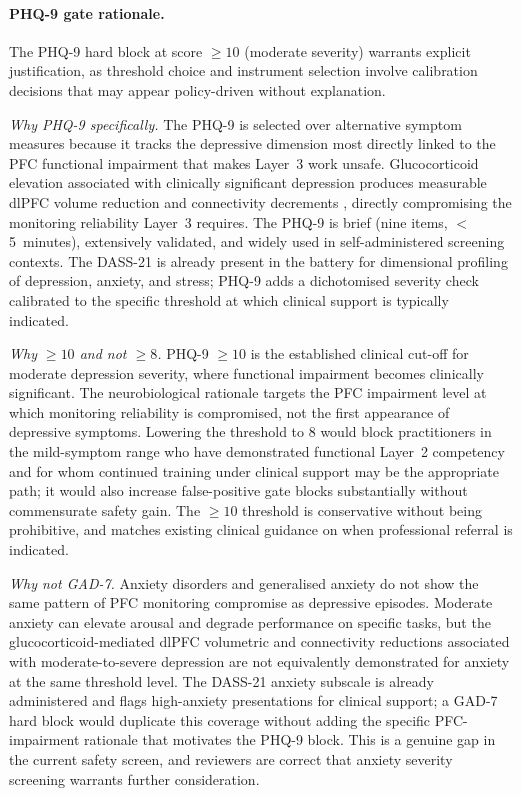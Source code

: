 \documentclass[12pt, a4paper]{article}
\begin{document}
\paragraph{PHQ-9 gate rationale.}
The PHQ-9 hard block at score $\geq 10$ (moderate severity) warrants explicit
justification, as threshold choice and instrument selection involve calibration
decisions that may appear policy-driven without explanation.

\emph{Why PHQ-9 specifically.} The PHQ-9 is selected over alternative symptom
measures because it tracks the depressive dimension most directly linked to the PFC
functional impairment that makes Layer~3 work unsafe. Glucocorticoid elevation
associated with clinically significant depression produces measurable dlPFC volume
reduction and connectivity decrements \citep{gkintoni2025}, directly compromising
the monitoring reliability Layer~3 requires. The PHQ-9 is brief (nine items,
$<$5~minutes), extensively validated, and widely used in self-administered screening
contexts. The DASS-21 is already present in the battery for dimensional profiling
of depression, anxiety, and stress; PHQ-9 adds a dichotomised severity check
calibrated to the specific threshold at which clinical support is typically indicated.

\emph{Why $\geq 10$ and not $\geq 8$.} PHQ-9 $\geq 10$ is the established clinical
cut-off for moderate depression severity, where functional impairment becomes
clinically significant. The neurobiological rationale targets the PFC impairment
level at which monitoring reliability is compromised, not the first appearance of
depressive symptoms. Lowering the threshold to 8 would block practitioners in the
mild-symptom range who have demonstrated functional Layer~2 competency and for whom
continued training under clinical support may be the appropriate path; it would
also increase false-positive gate blocks substantially without commensurate safety
gain. The $\geq 10$ threshold is conservative without being prohibitive, and matches
existing clinical guidance on when professional referral is indicated.

\emph{Why not GAD-7.} Anxiety disorders and generalised anxiety do not show the
same pattern of PFC monitoring compromise as depressive episodes. Moderate anxiety
can elevate arousal and degrade performance on specific tasks, but the glucocorticoid-mediated
dlPFC volumetric and connectivity reductions associated with moderate-to-severe
depression are not equivalently demonstrated for anxiety at the same threshold level.
The DASS-21 anxiety subscale is already administered and flags high-anxiety presentations
for clinical support; a GAD-7 hard block would duplicate this coverage without
adding the specific PFC-impairment rationale that motivates the PHQ-9 block.
This is a genuine gap in the current safety screen, and reviewers are correct that
anxiety severity screening warrants further consideration.
\end{document}
